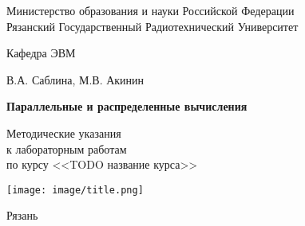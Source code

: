
\begin{titlepage}

\begin{center}

Министерство образования и науки Российской Федерации \\
Рязанский Государственный Радиотехнический Университет

\bigskip

Кафедра ЭВМ

\vspace{5em}

В.А. Саблина, М.В. Акинин

\vspace{3em}

{\Large \bf Параллельные и распределенные вычисления}

\vspace{3em}

Методические указания\\
к лабораторным работам\\
по курсу <<TODO название курса>>

\vfill

\texttt{[image: image/title.png]}

\vfill

Рязань \the\year

\end{center}

\thispagestyle{empty}

\end{titlepage}

\setcounter{page}{2}

\newpage

